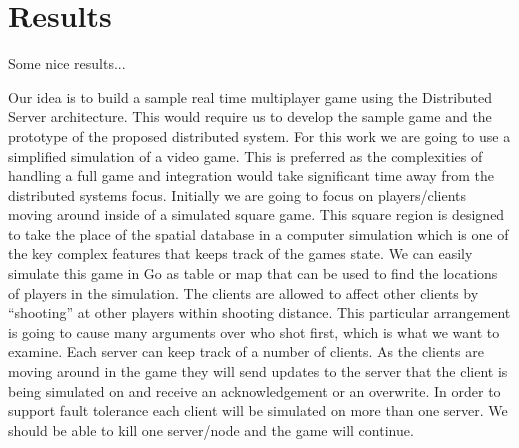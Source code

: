 

\section{Results}
\label{sec:results}

Some nice results...

Our idea is to build a sample real time multiplayer game using the Distributed Server architecture. This would require us to develop the sample game and the prototype of the proposed distributed system. 
For this work we are going to use a simplified simulation of a video game. This is preferred as the complexities of handling a full game and integration would take significant time away from the distributed systems focus. Initially we are going to focus on players/clients moving around inside of a simulated square game. This square region is designed to take the place of the spatial database in a computer simulation which is one of the key complex features that keeps track of the games state. We can easily simulate this game in Go as table or map that can be used to find the locations of players in the simulation. The clients are allowed to affect other clients by “shooting” at other players within shooting distance. This particular arrangement is going to cause many arguments over who shot first, which is what we want to examine.
Each server can keep track of a number of clients. As the clients are moving around in the game they will send updates to the server that the client is being simulated on  and receive an acknowledgement or an overwrite. In order to support fault tolerance each client will be simulated on more than one server. We should be able to kill one server/node and the game will continue.